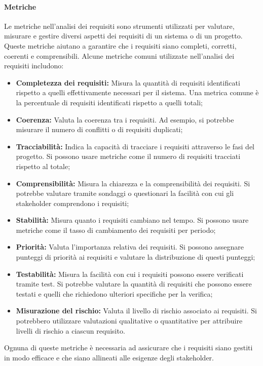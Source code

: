\documentclass{article}
\begin{document}
\paragraph{Metriche}
Le metriche nell'analisi dei requisiti sono strumenti utilizzati per valutare, misurare e gestire diversi aspetti dei requisiti di un sistema o di un progetto. Queste metriche aiutano a garantire che i requisiti siano completi, corretti, coerenti e comprensibili. Alcune metriche comuni utilizzate nell'analisi dei requisiti includono:
\begin{itemize}
    \item \textbf{Completezza dei requisiti:} Misura la quantità di requisiti identificati rispetto a quelli effettivamente necessari per il sistema. Una metrica comune è la percentuale di requisiti identificati rispetto a quelli totali;
    \item \textbf{Coerenza:} Valuta la coerenza tra i requisiti. Ad esempio, si potrebbe misurare il numero di conflitti o di requisiti duplicati;
    \item \textbf{Tracciabilità:} Indica la capacità di tracciare i requisiti attraverso le fasi del progetto. Si possono usare metriche come il numero di requisiti tracciati rispetto al totale;
    \item \textbf{Comprensibilità:} Misura la chiarezza e la comprensibilità dei requisiti. Si potrebbe valutare tramite sondaggi o questionari la facilità con cui gli stakeholder comprendono i requisiti;
    \item \textbf{Stabilità:} Misura quanto i requisiti cambiano nel tempo. Si possono usare metriche come il tasso di cambiamento dei requisiti per periodo;
    \item \textbf{Priorità:} Valuta l'importanza relativa dei requisiti. Si possono assegnare punteggi di priorità ai requisiti e valutare la distribuzione di questi punteggi;
    \item \textbf{Testabilità:} Misura la facilità con cui i requisiti possono essere verificati tramite test. Si potrebbe valutare la quantità di requisiti che possono essere testati e quelli che richiedono ulteriori specifiche per la verifica;
    \item \textbf{Misurazione del rischio:} Valuta il livello di rischio associato ai requisiti. Si potrebbero utilizzare valutazioni qualitative o quantitative per attribuire livelli di rischio a ciascun requisito.
\end{itemize}
Ognuna di queste metriche è necessaria ad assicurare che i requisiti siano gestiti in modo efficace e che siano allineati alle esigenze degli stakeholder.
\end{document}
